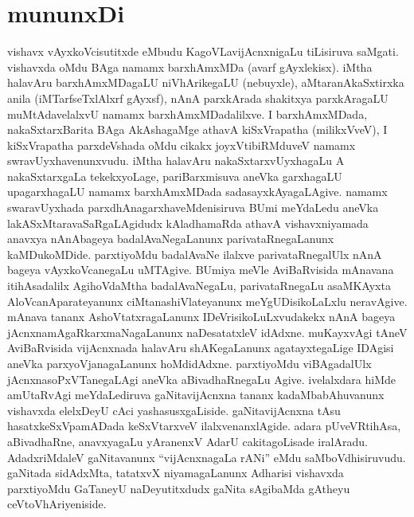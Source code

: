\chapter*{mununxDi}

vishavx vAyxkoVcisutitxde eMbudu KagoVLavijAcnxnigaLu tiLisiruva saMgati. vishavxda oMdu BAga namamx barxhAmxMDa (avarf gAyxlekisx). iMtha halavAru barxhAmxMDagaLU niVhArikegaLU (nebuyxle), aMtaranAkaSxtirxka anila (iMTarfseTxlAlxrf gAyxsf), nAnA parxkArada shakitxya parxkAragaLU muMtAdavelalxvU namamx barxhAmxMDadalilxve. I barxhAmxMDada, nakaSxtarxBarita BAga AkAshagaMge athavA kiSxVrapatha (milikxVveV), I kiSxVrapatha parxdeVshada oMdu cikakx joyxVtibiRMduveV namamx swravUyxhavenunxvudu. iMtha halavAru nakaSxtarxvUyxhagaLu A nakaSxtarxgaLa tekekxyoLage, pariBarxmisuva aneVka garxhagaLU upagarxhagaLU namamx barxhAmxMDada sadasayxkAyagaLAgive. namamx swaravUyxhada parxdhAnagarxhaveMdenisiruva BUmi meYdaLedu aneVka lakASxMtaravaSaRgaLAgidudx kAladhamaRda athavA vishavxniyamada anavxya nAnAbageya badalAvaNegaLanunx parivataRnegaLanunx kaMDukoMDide. parxtiyoMdu badalAvaNe ilalxve parivataRnegalUlx nAnA bageya vAyxkoVcanegaLu uMTAgive. BUmiya meVle AviBaRvisida mAnavana itihAsadalilx AgihoVdaMtha badalAvaNegaLu, parivataRnegaLu asaMKAyxta AloVcanAparateyanunx ciMtanashiVlateyanunx meYgUDisikoLaLxlu neravAgive. mAnava tananx AshoVtatxragaLanunx IDeVrisikoLuLxvudakekx nAnA bageya jAcnxnamAgaRkarxmaNagaLanunx naDesatatxleV idAdxne. muKayxvAgi tAneV AviBaRvisida vijAcnxnada halavAru shAKegaLanunx agatayxtegaLige IDAgisi aneVka parxyoVjanagaLanunx hoMdidAdxne. parxtiyoMdu viBAgadalUlx jAcnxnasoPxVTanegaLAgi aneVka aBivadhaRnegaLu Agive. ivelalxdara hiMde amUtaRvAgi meYdaLediruva gaNitavijAcnxna tananx kadaMbabAhuvanunx vishavxda elelxDeyU cAci yashasusxgaLiside. gaNitavijAcnxna tAsu hasatxkeSxVpamADada keSxVtarxveV ilalxvenanxlAgide. adara pUveVRtihAsa, aBivadhaRne, anavxyagaLu yAranenxV AdarU cakitagoLisade iralAradu. AdadxriMdaleV gaNitavanunx ``vijAcnxnagaLa rANi'' eMdu saMboVdhisiruvudu. gaNitada sidAdxMta, tatatxvX niyamagaLanunx Adharisi vishavxda parxtiyoMdu GaTaneyU naDeyutitxdudx gaNita sAgibaMda gAtheyu ceVtoVhAriyeniside.

\bigskip

